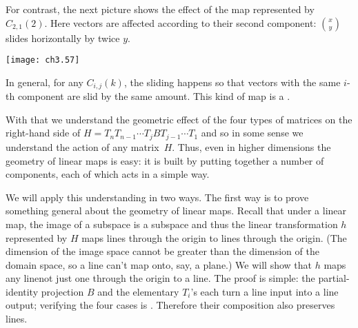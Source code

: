 For contrast, the next picture shows the effect of the map represented by 
$C_{2,1}(2)$.
Here vectors are affected according to their  
second component:
$\binom{x}{y}$ slides horizontally by twice $y$.
\begin{center}
  \texttt{[image: ch3.57]}
\end{center}
In general, for any $C_{i,j}(k)$, the
sliding happens so that vectors with the same $i$-th component
are slid by the same amount.
This kind of map is a 
.

With that we understand the geometric effect of the four types 
of matrices on the right-hand side of
$H=T_nT_{n-1}\cdots T_jBT_{j-1}\cdots T_1$
and so in some sense we understand  
the action of any matrix~$H$.
Thus, even in higher dimensions the geometry of linear maps is easy: it 
is built by putting
together a number of components, each of which acts in a simple way.

We will apply this understanding in two ways.
The first way is to prove something general about 
the geometry of linear maps. 
Recall that under a linear map, the image of a subspace is a subspace
and thus the linear transformation $h$ represented by $H$ maps lines 
through the origin to lines through the origin.
(The dimension of the image space cannot be greater than 
the dimension of the domain space, so a line can't map onto, say, a plane.)
We will show that $h$ maps any line\Dash not just one through the origin\Dash 
to a line.
The proof is simple:
the partial-identity projection $B$ and the elementary $T_i$'s
each turn a line input into a line output; 
verifying the four cases is .
Therefore their composition also preserves lines.

